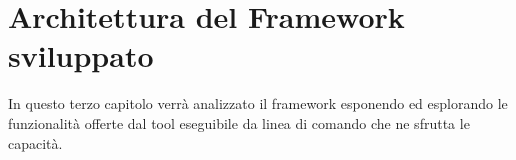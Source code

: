 \chapter{Architettura del Framework sviluppato}


In questo terzo capitolo verrà analizzato il framework esponendo ed esplorando le funzionalità offerte dal tool eseguibile da linea di comando che ne sfrutta le capacità. 






